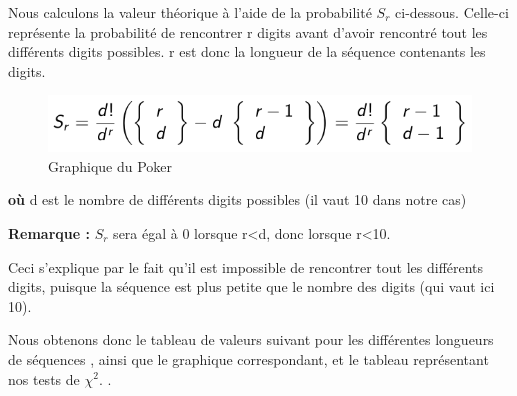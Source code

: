 \documentclass[10pt,a4paper]{article}
\begin{document}
Nous calculons la valeur théorique à l'aide de la probabilité $ S_r$ ci-dessous. Celle-ci représente la probabilité de rencontrer r digits avant d'avoir rencontré tout les différents digits possibles. r est donc la longueur de la séquence contenants les digits.
\begin{flushleft}

\begin{figure}[h]
		\centering
\includegraphics[scale=0.4]{images/formule.png}  
\caption{Graphique du Poker}
	\end{figure}

\textbf{où} d est le nombre de différents digits possibles (il vaut 10 dans notre cas)

\textbf{Remarque :} $S_r$ sera égal à 0 lorsque r<d, donc lorsque r<10.

\end{flushleft}

 

Ceci s'explique par le fait qu'il est impossible de rencontrer tout les différents digits, puisque la séquence est plus petite que le nombre des digits (qui vaut ici 10). 

Nous obtenons donc le tableau de valeurs suivant pour les différentes longueurs de séquences , ainsi que le graphique correspondant, et le tableau représentant nos tests de $\chi^2$. .

\newpage
\end{document}
